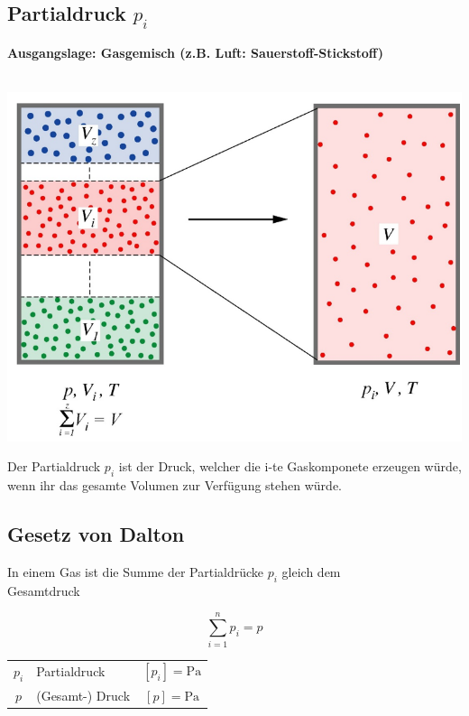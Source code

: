 \vfill\null
\columnbreak

\subsection{Partialdruck $p_i$}
\textbf{Ausgangslage: Gasgemisch (z.B. Luft: Sauerstoff-Stickstoff)} \\
\\

\begin{minipage}{0.48\linewidth}
\includegraphics[width=\linewidth]{Bilder/partialdruck}
\end{minipage}
\hfill
\begin{minipage}{0.5\linewidth}
Der Partialdruck $p_i$ ist der Druck, welcher die i-te Gaskomponete erzeugen würde, wenn ihr das gesamte Volumen zur Verfügung stehen würde. \\
\end{minipage}


\subsection{Gesetz von Dalton}
In einem Gas ist die Summe der Partialdrücke $p_i$ gleich dem \\
Gesamtdruck 

$$ \boxed{ \sum_{i=1}^n  p_i = p } $$ 



\begin{tabular}{c l c}
	$p_i$ & Partialdruck & $[p_i] = \mathrm{Pa}$ \\
	$p$ & (Gesamt-) Druck & $[p] = \mathrm{Pa}$ \\
\end{tabular}


